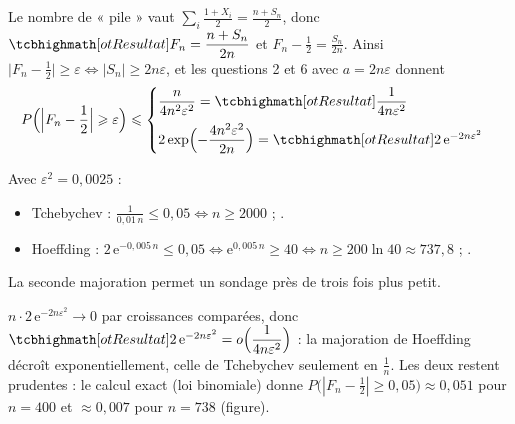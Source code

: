 \begin{corrigeEval}{}{}
\begin{questions}[start=7]
  \item Le nombre de « pile » vaut $\sum_i\frac{1+X_i}{2}=\frac{n+S_n}{2}$,
    donc $\res{F_n=\dfrac{n+S_n}{2n}}$ et $F_n-\frac12=\frac{S_n}{2n}$. Ainsi
    $\bigl|F_n-\frac12\bigr|\geqslant\varepsilon\iff|S_n|\geqslant2n\varepsilon$,
    et les questions 2 et 6 avec $a=2n\varepsilon$ donnent
    \[P\Bigl(\Bigl|F_n-\frac12\Bigr|\geqslant\varepsilon\Bigr)\leqslant
      \begin{cases}\dfrac{n}{4n^{2}\varepsilon^{2}}=\res{\dfrac{1}{4n\varepsilon^{2}}}\\[3mm]
      2\exp\Bigl(-\dfrac{4n^{2}\varepsilon^{2}}{2n}\Bigr)=\res{2\,\mathrm{e}^{-2n\varepsilon^{2}}}\end{cases}\]
  \item Avec $\varepsilon^{2}=0{,}0025$ :
    \begin{itemize}
      \item Tchebychev : $\frac{1}{0{,}01\,n}\leqslant0{,}05\iff n\geqslant2000$ ;
        .
      \item Hoeffding : $2\,\mathrm{e}^{-0{,}005\,n}\leqslant0{,}05\iff
        \mathrm{e}^{0{,}005\,n}\geqslant40\iff n\geqslant200\ln40\approx737{,}8$ ;
        .
    \end{itemize}
    La seconde majoration permet un sondage près de trois fois plus petit.
  \item $n\cdot2\,\mathrm{e}^{-2n\varepsilon^{2}}\to0$ par croissances
    comparées, donc
    $\res{2\,\mathrm{e}^{-2n\varepsilon^{2}}=o\Bigl(\dfrac{1}{4n\varepsilon^{2}}\Bigr)}$ :
    la majoration de Hoeffding décroît exponentiellement, celle de
    Tchebychev seulement en $\frac1n$. Les deux restent prudentes : le calcul exact (loi
    binomiale) donne $P\bigl(|F_n-\frac12|\geqslant0{,}05\bigr)\approx0{,}051$
    pour $n=400$ et $\approx0{,}007$ pour $n=738$ (figure).
\end{questions}
\begin{center}\begin{minipage}{\linewidth}\centering
{}
\end{minipage}
\end{center}
\end{corrigeEval}
